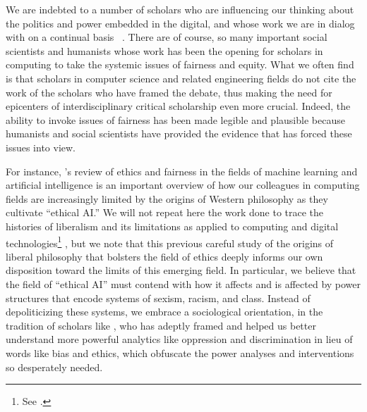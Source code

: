 \documentclass[11pt]{article}
\begin{document}
We are indebted to a number of scholars who are influencing our thinking about the politics and power embedded in the digital, and whose work we are in dialog with on a continual basis ~\cite{benjamin2019race,chun2008control,daniels2009cyber,eubanks2018automating,hoffmann2019fairness,noble2018algorithms1,pasquale2016black,roberts2019behind,vaidhyanathan2006afterword,vaidhyanathan2018antisocial}. There are of course, so many important social scientists and humanists whose work has been the opening for scholars in computing to take the systemic issues of fairness and equity. What we often find is that scholars in computer science and related engineering fields do not cite the work of the scholars who have framed the debate, thus making the need for epicenters of interdisciplinary critical scholarship even more crucial. Indeed, the ability to invoke issues of fairness has been made legible and plausible because humanists and social scientists have provided the evidence that has forced these issues into view. 


For instance, \cite{binns2018fairness}'s  review of ethics and fairness in the fields of machine learning and artificial intelligence is an important overview of how our colleagues in computing fields are increasingly limited by the origins of Western philosophy as they cultivate “ethical AI.” We will not repeat here the work done to trace the histories of liberalism and its limitations as applied to computing and digital technologies\footnote{See \cite{BuiNoble}.} , but we note that this previous careful study of the origins of liberal philosophy that bolsters the field of ethics deeply informs our own disposition toward the limits of this emerging field. In particular, we believe that the field of “ethical AI” must contend with how it affects and is affected by power structures that encode systems of sexism, racism, and class. Instead of depoliticizing these systems, we embrace a sociological orientation, in the tradition of scholars like \cite{daniels2009cyber}, who has adeptly framed and helped us better understand more powerful analytics like oppression and discrimination in lieu of words like bias and ethics, which obfuscate the power analyses and interventions so desperately needed. 
\end{document}
